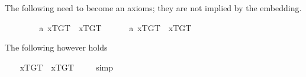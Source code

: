 \begin{isabellebody}
\isamarkuptrue%
%
\isamarkuptrue%
%
\begin{isamarkuptext}%
The following need to become an axioms; they are not implied by the embedding.%
\end{isamarkuptext}%
\isamarkuptrue%
\ \ \isamarkupfalse%
\ \ \isanewline
\ \ \ a{}{}{\isacharcolon}\ {\isachardoublequoteopen}{\isacharbrackleft}{\isasymlbrace}x\isactrlsup T{\isacharcomma}G\isactrlsup T{\isasymrbrace}\ \isactrlbold {\isasymrightarrow}\ \isactrlbold {\isasymbox}{\isasymlbrace}x\isactrlsup T{\isacharcomma}G\isactrlsup T{\isasymrbrace}{\isacharbrackright}\ {\isacharequal}\ {\isasymtop}{\isachardoublequoteclose}\ \isanewline
\ \ \ a{}{}{\isacharcolon}\ {\isachardoublequoteopen}{\isacharbrackleft}\isactrlbold {\isasymA}{\isasymlbrace}x\isactrlsup T{\isacharcomma}G\isactrlsup T{\isasymrbrace}\ \isactrlbold {\isasymrightarrow}\ {\isasymlbrace}x\isactrlsup T{\isacharcomma}G\isactrlsup T{\isasymrbrace}{\isacharbrackright}\ {\isacharequal}\ {\isasymtop}{\isachardoublequoteclose}%
\begin{isamarkuptext}%
The following however holds%
\end{isamarkuptext}%
\isamarkuptrue%
\ \ \isamarkupfalse%
\ {\isachardoublequoteopen}{\isacharbrackleft}\isactrlbold {\isasymbox}{\isacharparenleft}\isactrlbold {\isasymA}{\isasymlbrace}x\isactrlsup T{\isacharcomma}G\isactrlsup T{\isasymrbrace}\ \isactrlbold {\isasymrightarrow}\ {\isasymlbrace}x\isactrlsup T{\isacharcomma}G\isactrlsup T{\isasymrbrace}{\isacharparenright}{\isacharbrackright}\ {\isacharequal}\ {\isasymtop}{\isachardoublequoteclose}%
\isadelimproof
\ %
\endisadelimproof
%
\isatagproof
{}\isamarkupfalse%
\ simp%
\endisatagproof
{\isafoldproof}%
%
\isadelimproof
%
\endisadelimproof
\ \isamarkupfalse%
%
\isadelimproof
\ %
\endisadelimproof
%
\isatagproof
{}\isamarkupfalse%
\isanewline
%
\endisatagproof
{\isafoldproof}%
%
\isadelimproof
%
\endisadelimproof
%
\isadelimproof
%
\endisadelimproof
%
\isatagproof
%
\endisatagproof
{\isafoldproof}%
%
\isadelimproof
%
\endisadelimproof
%
\isadelimproof
%
\endisadelimproof
%
\isatagproof
%
\endisatagproof
{\isafoldproof}%
%
\isadelimproof
%
\endisadelimproof
%
\isadelimproof
%
\endisadelimproof
%
\isatagproof
%
\endisatagproof
{\isafoldproof}%
%
\isadelimproof
%
\endisadelimproof
%
\isadelimproof
%
\endisadelimproof
%
\isatagproof
%
\endisatagproof
{\isafoldproof}%

\end{isabellebody}
